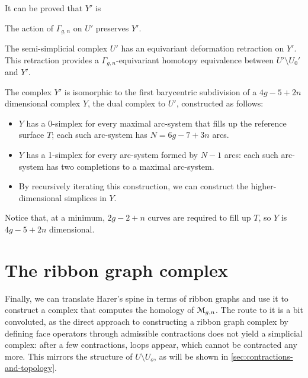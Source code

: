 It can be proved that $Y'$ is 

The action of $\Gamma_{g,n}$ on $U'$ preserves $Y'$.
\begin{theorem}
  \label{thm:spine}
  The semi-simplicial complex $U'$ has an equivariant deformation
  retraction on $Y'$.  This retraction provides a
  $\Gamma_{g,n}$-equivariant homotopy equivalence between $U' \setminus U_0'$ and
  $Y'$.
\end{theorem}

The complex $Y'$ is isomorphic to the first barycentric subdivision of
a $4g - 5 + 2n$ dimensional complex $Y$, the dual complex to $U'$,
constructed as follows:
\begin{itemize}
\item $Y$ has a 0-simplex for every maximal arc-system that fills up the
  reference surface $T$; each such arc-system has $N = 6g - 7 + 3n$ arcs.
\item $Y$ has a 1-simplex for every arc-system formed by $N-1$ arcs:
  each such arc-system has two completions to a maximal arc-system.
\item By recursively iterating this construction, we can construct the
  higher-dimensional simplices in $Y$.
\end{itemize}
Notice that, at a minimum, $2g - 2 +n$ curves are required to fill up
$T$, so $Y$ is $4g - 5 + 2n$ dimensional.



\section{The ribbon graph complex}
\label{sec:ribbon-graph-complex}

Finally, we can translate Harer's spine in terms of ribbon graphs and
use it to construct a complex that computes the homology of
$\mathcal{M}_{g,n}$.  The route to it is a bit convoluted, as the direct
approach to constructing a ribbon graph complex by defining face
operators through admissible contractions does not yield a simplicial
complex: after a few contractions, loops appear, which cannot be
contracted any more.  This mirrors the structure of $U \setminus U_o$, as will
be shown in \ref{sec:contractions-and-topology}.


